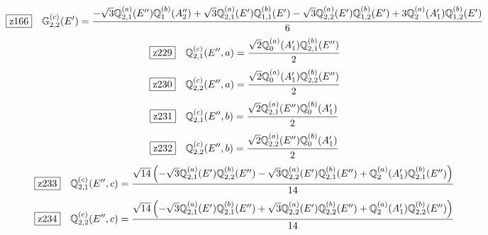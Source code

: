\documentclass[fleqn,10pt,landscape]{jsarticle}
\begin{document}
\begin{dmath*}
\hspace*{3mm}\fbox{z166}\quad \mathbb{G}_{2,2}^{(c)}(E^{\prime})=\frac{- \sqrt{3} \mathbb{Q}_{2,1}^{(a)}(E^{\prime\prime}) \mathbb{Q}_{1}^{(b)}(A_{2}^{\prime\prime}) + \sqrt{3} \mathbb{Q}_{2,1}^{(a)}(E^{\prime}) \mathbb{Q}_{1,1}^{(b)}(E^{\prime}) - \sqrt{3} \mathbb{Q}_{2,2}^{(a)}(E^{\prime}) \mathbb{Q}_{1,2}^{(b)}(E^{\prime}) + 3 \mathbb{Q}_{2}^{(a)}(A_{1}^{\prime}) \mathbb{Q}_{1,2}^{(b)}(E^{\prime})}{6}
\end{dmath*}
\begin{dmath*}
\hspace*{3mm}\fbox{z229}\quad \mathbb{Q}_{2,1}^{(c)}(E^{\prime\prime},a)=\frac{\sqrt{2} \mathbb{Q}_{0}^{(a)}(A_{1}^{\prime}) \mathbb{Q}_{2,1}^{(b)}(E^{\prime\prime})}{2}
\end{dmath*}
\begin{dmath*}
\hspace*{3mm}\fbox{z230}\quad \mathbb{Q}_{2,2}^{(c)}(E^{\prime\prime},a)=\frac{\sqrt{2} \mathbb{Q}_{0}^{(a)}(A_{1}^{\prime}) \mathbb{Q}_{2,2}^{(b)}(E^{\prime\prime})}{2}
\end{dmath*}
\begin{dmath*}
\hspace*{3mm}\fbox{z231}\quad \mathbb{Q}_{2,1}^{(c)}(E^{\prime\prime},b)=\frac{\sqrt{2} \mathbb{Q}_{2,1}^{(a)}(E^{\prime\prime}) \mathbb{Q}_{0}^{(b)}(A_{1}^{\prime})}{2}
\end{dmath*}
\begin{dmath*}
\hspace*{3mm}\fbox{z232}\quad \mathbb{Q}_{2,2}^{(c)}(E^{\prime\prime},b)=\frac{\sqrt{2} \mathbb{Q}_{2,2}^{(a)}(E^{\prime\prime}) \mathbb{Q}_{0}^{(b)}(A_{1}^{\prime})}{2}
\end{dmath*}
\begin{dmath*}
\hspace*{3mm}\fbox{z233}\quad \mathbb{Q}_{2,1}^{(c)}(E^{\prime\prime},c)=\frac{\sqrt{14} \left(- \sqrt{3} \mathbb{Q}_{2,1}^{(a)}(E^{\prime}) \mathbb{Q}_{2,2}^{(b)}(E^{\prime\prime}) - \sqrt{3} \mathbb{Q}_{2,2}^{(a)}(E^{\prime}) \mathbb{Q}_{2,1}^{(b)}(E^{\prime\prime}) + \mathbb{Q}_{2}^{(a)}(A_{1}^{\prime}) \mathbb{Q}_{2,1}^{(b)}(E^{\prime\prime})\right)}{14}
\end{dmath*}
\begin{dmath*}
\hspace*{3mm}\fbox{z234}\quad \mathbb{Q}_{2,2}^{(c)}(E^{\prime\prime},c)=\frac{\sqrt{14} \left(- \sqrt{3} \mathbb{Q}_{2,1}^{(a)}(E^{\prime}) \mathbb{Q}_{2,1}^{(b)}(E^{\prime\prime}) + \sqrt{3} \mathbb{Q}_{2,2}^{(a)}(E^{\prime}) \mathbb{Q}_{2,2}^{(b)}(E^{\prime\prime}) + \mathbb{Q}_{2}^{(a)}(A_{1}^{\prime}) \mathbb{Q}_{2,2}^{(b)}(E^{\prime\prime})\right)}{14}
\end{dmath*}
\end{document}

